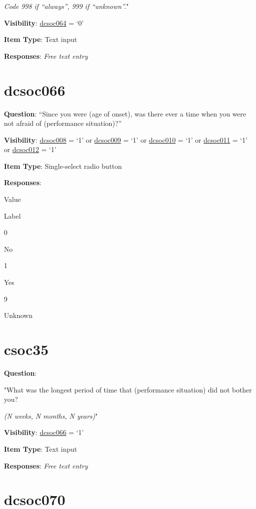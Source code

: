 \documentclass[]{book}
\begin{document}
\emph{Code 998 if ``always'', 999 if ``unknown''.}"

\textbf{Visibility}: \protect\hyperlink{dcsoc064}{dcsoc064} = `0'

\textbf{Item Type}: Text input

\textbf{Responses}: \emph{Free text entry}

\hypertarget{dcsoc066}{%
\section{dcsoc066}\label{dcsoc066}}

\textbf{Question}: ``Since you were (age of onset), was there ever a time when you were not afraid of (performance situation)?''

\textbf{Visibility}: \protect\hyperlink{dcsoc008}{dcsoc008} = `1' or \protect\hyperlink{dcsoc009}{dcsoc009} = `1' or \protect\hyperlink{dcsoc010}{dcsoc010} = `1' or \protect\hyperlink{dcsoc011}{dcsoc011} = `1' or \protect\hyperlink{dcsoc012}{dcsoc012} = `1'

\textbf{Item Type}: Single-select radio button

\textbf{Responses}:

Value

Label

0

No

1

Yes

9

Unknown

\hypertarget{csoc35}{%
\section{csoc35}\label{csoc35}}

\textbf{Question}:

"What was the longest period of time that (performance situation) did not bother you?

\emph{(N weeks, N months, N years)}"

\textbf{Visibility}: \protect\hyperlink{dcsoc066}{dcsoc066} = `1'

\textbf{Item Type}: Text input

\textbf{Responses}: \emph{Free text entry}

\hypertarget{dcsoc070}{%
\section{dcsoc070}\label{dcsoc070}}
\end{document}
